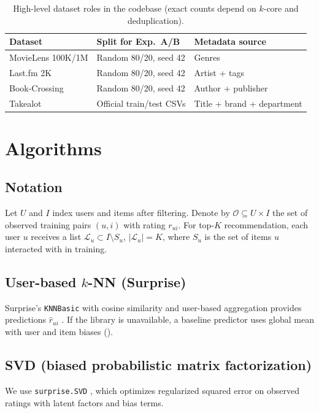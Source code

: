 \documentclass[11pt,a4paper,twoside,openright]{report}
\newcommand{\file}[1]{\texttt{\detokenize{#1}}}
\begin{document}
\begin{table}[htbp]
  \centering
  \caption{High-level dataset roles in the codebase (exact counts depend on $k$-core and deduplication).}
  \label{tab:datasets}
  \begin{tabular}{lll}
    \toprule
    \textbf{Dataset} & \textbf{Split for Exp.~A/B} & \textbf{Metadata source} \\
    \midrule
    MovieLens 100K/1M & Random 80/20, seed 42 & Genres \\
    Last.fm 2K & Random 80/20, seed 42 & Artist + tags \\
    Book-Crossing & Random 80/20, seed 42 & Author + publisher \\
    Takealot & Official train/test CSVs & Title + brand + department \\
    \bottomrule
  \end{tabular}
\end{table}

\chapter{Algorithms}

\section{Notation}
Let $U$ and $I$ index users and items after filtering. Denote by $\mathcal{O} \subseteq U \times I$ the set of observed training pairs $(u,i)$ with rating $r_{ui}$. For top-$K$ recommendation, each user $u$ receives a list $\mathcal{L}_u \subset I \setminus S_u$, $|\mathcal{L}_u|=K$, where $S_u$ is the set of items $u$ interacted with in training.

\section{User-based $k$-NN (Surprise)}
Surprise's \texttt{KNNBasic} with cosine similarity and user-based aggregation provides predictions $\hat{r}_{ui}$ \citep{hug2020surprise}. If the library is unavailable, a baseline predictor uses global mean with user and item biases (\file{\_FallbackCF}).

\section{SVD (biased probabilistic matrix factorization)}
We use \texttt{surprise.SVD} \citep{hug2020surprise,koren2009matrix}, which optimizes regularized squared error on observed ratings with latent factors and bias terms.
\end{document}
